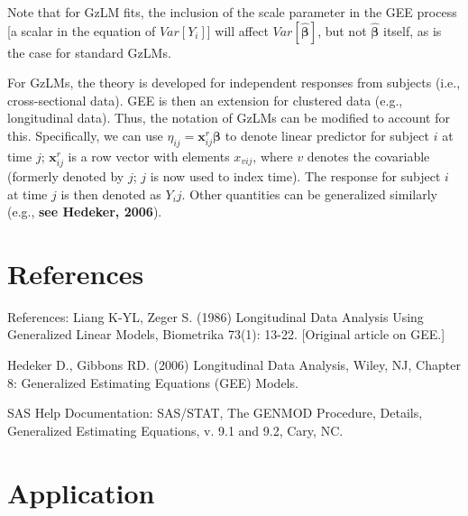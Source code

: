 \documentclass[
  9pt,
  ignorenonframetext,
]{beamer}
\begin{document}
\begin{frame}{}
\protect\hypertarget{section-7}{}
Note that for GzLM fits, the inclusion of the scale parameter in the GEE
process {[}a scalar in the equation of \(Var[Y_i]\){]} will affect
\(Var[\pmb {\hat \beta}]\), but not \(\pmb {\hat \beta}\) itself, as is
the case for standard GzLMs.

For GzLMs, the theory is developed for independent responses from
subjects (i.e., cross-sectional data). GEE is then an extension for
clustered data (e.g., longitudinal data). Thus, the notation of GzLMs
can be modified to account for this. Specifically, we can use
\(\eta _{ij} =\pmb x_{ij} ^r \pmb \beta\) to denote linear predictor for
subject \(i\) at time \(j\); \(\pmb x_{ij} ^r\) is a row vector with
elements \(x_{vij}\), where \(v\) denotes the covariable (formerly
denoted by \(j\); \(j\) is now used to index time). The response for
subject \(i\) at time \(j\) is then denoted as \(Y_ij\). Other
quantities can be generalized similarly (e.g., \textbf{see Hedeker,
2006}).
\end{frame}

\hypertarget{references}{%
\section{References}\label{references}}

\begin{frame}{References:}
\protect\hypertarget{references-1}{}
Liang K-YL, Zeger S. (1986) Longitudinal Data Analysis Using Generalized
Linear Models, Biometrika 73(1): 13-22. {[}Original article on GEE.{]}

Hedeker D., Gibbons RD. (2006) Longitudinal Data Analysis, Wiley, NJ,
Chapter 8: Generalized Estimating Equations (GEE) Models.

SAS Help Documentation: SAS/STAT, The GENMOD Procedure, Details,
Generalized Estimating Equations, v. 9.1 and 9.2, Cary, NC.
\end{frame}

\hypertarget{application}{%
\section{Application}\label{application}}
\end{document}
